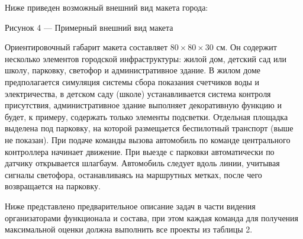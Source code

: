 Ниже приведен возможный внешний вид макета города:


\centerline{Рисунок 4 — Примерный внешний вид макета}

Ориентировочный габарит макета составляет $80\times 80 \times 30$ см. Он содержит несколько элементов городской инфраструктуры: жилой дом, детский сад или школу, парковку, светофор и административное здание. В жилом доме предполагается симуляция системы сбора показания счетчиков воды и электричества, в детском саду (школе) устанавливается система контроля присутствия, административное здание выполняет декоративную функцию и будет, к примеру, содержать только элементы подсветки. Отдельная площадка выделена под парковку, на которой размещается беспилотный транспорт (выше не показан). При подаче команды вызова автомобиль по команде центрального контроллера начинает движение. При выезде с парковки автоматически по датчику открывается шлагбаум. Автомобиль следует вдоль линии, учитывая сигналы светофора, останавливаясь на маршрутных метках, после чего возвращается на парковку.

Ниже представлено предварительное описание задач в части видения организаторами функционала и состава, при этом каждая команда для получения максимальной оценки должна выполнить все проекты из таблицы 2.

